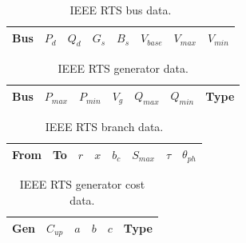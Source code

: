 
\begin{table}[h]
\caption{IEEE RTS bus data.}
\label{tbl:rtsbus}
\begin{center}
\begin{tabular}{c|c|c|c|c|c|c|c}
\hline
Bus &$P_d$ &$Q_d$ &$G_s$ &$B_s$ &$V_{base}$ &$V_{max}$ &$V_{min}$\\
\hline\hline

\hline
\end{tabular}
\end{center}
\end{table}

\begin{table}[h]
\caption{IEEE RTS generator data.}
\label{tbl:rtsgen}
\begin{center}
\begin{tabular}{c|c|c|c|c|c|c}
\hline
Bus &$P_{max}$ &$P_{min}$ &$V_g$ &$Q_{max}$ &$Q_{min}$ &Type\\
\hline\hline

\hline
\end{tabular}
\end{center}
\end{table}

\begin{table}[h]
\caption{IEEE RTS branch data.}
\label{tbl:rtsbranch}
\begin{center}
\begin{tabular}{c|c|c|c|c|c|c|c}
\hline
From &To &$r$ &$x$ &$b_c$ &$S_{max}$ &$\tau$ &$\theta_{ph}$\\
\hline\hline

\hline
\end{tabular}
\end{center}
\end{table}

\begin{table}[h]
\caption{IEEE RTS generator cost data.}
\label{tbl:rtsgencost}
\begin{center}
\begin{tabular}{c|c|c|c|c|c}
\hline
Gen &$C_{up}$ &$a$ &$b$ &$c$ &Type\\
\hline\hline

\hline
\end{tabular}
\end{center}
\end{table}
